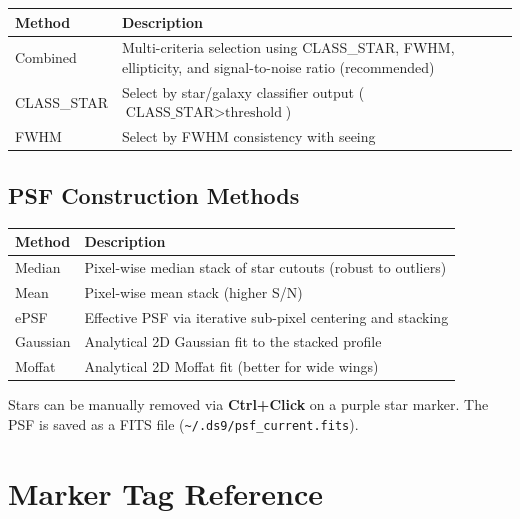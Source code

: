 \documentclass[11pt,fleqn]{book}
\begin{document}
\begin{center}
\begin{tabular}{lp{9cm}}
\toprule
\textbf{Method} & \textbf{Description} \\
\midrule
Combined & Multi-criteria selection using CLASS\_STAR, FWHM, ellipticity, and signal-to-noise ratio (recommended) \\
CLASS\_STAR & Select by star/galaxy classifier output ($\text{CLASS\_STAR} > \text{threshold}$) \\
FWHM & Select by FWHM consistency with seeing \\
\bottomrule
\end{tabular}
\end{center}

\subsection{PSF Construction Methods}

\begin{center}
\begin{tabular}{lp{9cm}}
\toprule
\textbf{Method} & \textbf{Description} \\
\midrule
Median & Pixel-wise median stack of star cutouts (robust to outliers) \\
Mean & Pixel-wise mean stack (higher S/N) \\
ePSF & Effective PSF via iterative sub-pixel centering and stacking \\
Gaussian & Analytical 2D Gaussian fit to the stacked profile \\
Moffat & Analytical 2D Moffat fit (better for wide wings) \\
\bottomrule
\end{tabular}
\end{center}

Stars can be manually removed via \textbf{Ctrl+Click} on a purple star marker. The PSF is saved as a FITS file (\texttt{\textasciitilde/.ds9/psf\_current.fits}).


\section{Marker Tag Reference}
\end{document}
